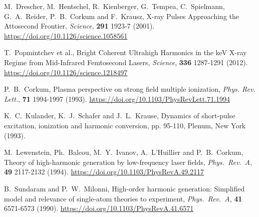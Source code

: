 \begin{thebibliography}{}


M.\ Drescher, M.\ Hentschel, R.\ Kienberger, G.\ Tempea, C.\ Spielmann, G.\ A.\ Reider, P.\ B.\ Corkum and F.\ Krausz, X-ray Pulses Approaching the Attosecond Frontier, \emph{Science}, \textbf{291} 1923-7 (2001). \url{https://doi.org/10.1126/science.1058561}



    T.\ Popmintchev et al., Bright Coherent Ultrahigh Harmonics in the keV X-ray Regime from Mid-Infrared Femtosecond Lasers, \emph{Science}, \textbf{336} 1287-1291 (2012). \url{https://doi.org/10.1126/science.1218497} 

P.\ B.\ Corkum, Plasma perspective on strong field multiple ionization, \emph{Phys. Rev. Lett.}, \textbf{71} 1994-1997 (1993). \url{https://doi.org/10.1103/PhysRevLett.71.1994}

K.\ C.\ Kulander, K.\ J.\ Schafer and J.\ L.\ Krause, Dynamics of short-pulse excitation, ionization and harmonic conversion, pp. 95-110, Plenum, New York (1993).

    M.\ Lewenstein, Ph.\ Balcou, M.\ Y.\ Ivanov, A.\ L'Huillier and P.\ B.\ Corkum, Theory of high-harmonic generation by low-frequency laser fields, \emph{Phys.\ Rev.\ A}, \textbf{49} 2117-2132 (1994). \url{https://doi.org/10.1103/PhysRevA.49.2117}

    B.\ Sundaram and P.\ W.\ Milonni, High-order harmonic generation: Simplified model and relevance of single-atom theories to experiment, \emph{Phys.\ Rev.\ A}, \textbf{41} 6571-6573 (1990). \url{https://doi.org/10.1103/PhysRevA.41.6571}
    

\end{thebibliography}
